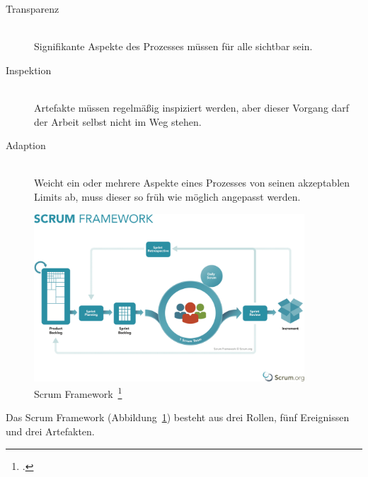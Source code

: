 \begin{description}
  \item[Transparenz] \hfill \\ Signifikante Aspekte des Prozesses müssen für alle sichtbar sein.
  \item[Inspektion] \hfill \\ Artefakte müssen regelmäßig inspiziert werden, aber dieser Vorgang darf der Arbeit selbst nicht im Weg stehen.
  \item[Adaption] \hfill \\ Weicht ein oder mehrere Aspekte eines Prozesses von seinen akzeptablen Limits ab, muss dieser so früh wie möglich angepasst werden.
\end{description}

\begin{savenotes}
  \begin{figure}[H] 
    \centering
    \includegraphics[width=0.9\textwidth]{img/scrum-framework.png}
    \caption[Scrum Framework]{Scrum Framework~\footcite{scrum_framework}}\label{fig:scrum_framework}
  \end{figure}
\end{savenotes}

Das Scrum Framework (Abbildung~\ref{fig:scrum_framework}) besteht aus drei Rollen, fünf Ereignissen und drei Artefakten.

